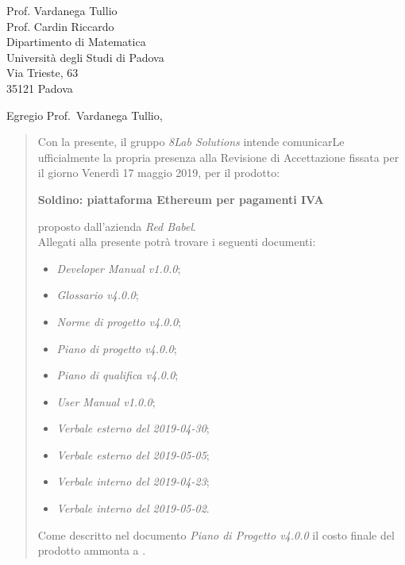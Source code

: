 
\begin{letter}{
		Prof. Vardanega Tullio \\
		Prof. Cardin Riccardo \\
		Dipartimento di Matematica \\
		Università degli Studi di Padova \\
		Via Trieste, 63 \\
		35121 Padova}
		
\opening{Egregio Prof.~Vardanega Tullio,}

\begin{quotation}
Con la presente, il gruppo \textit{8Lab Solutions} intende 
comunicarLe ufficialmente la propria presenza alla Revisione di 
Accettazione fissata per il giorno Venerdì 17 maggio 2019, per il prodotto:

\begin{center}
	\textbf{Soldino: piattaforma Ethereum per pagamenti IVA}
\end{center}

\noindent proposto dall'azienda \textit{Red Babel}. \\
Allegati alla presente potrà trovare i seguenti documenti:

\begin{itemize}
	
	\item \textit{Developer Manual v1.0.0};
	
	\item \textit{Glossario v4.0.0};
	
	\item \textit{Norme di progetto v4.0.0};

	\item \textit{Piano di progetto v4.0.0};

	\item \textit{Piano di qualifica v4.0.0};
	
	\item \textit{User Manual v1.0.0};
	
	
	\item \textit{Verbale esterno del 2019-04-30};
	\item \textit{Verbale esterno del 2019-05-05};
	\item \textit{Verbale interno del 2019-04-23};
	\item \textit{Verbale interno del 2019-05-02}.
\end{itemize}
	


\noindent Come descritto nel documento \textit{Piano di Progetto v4.0.0} il 
costo finale del prodotto ammonta a \textbf{}.\\


\end{quotation}
\end{letter}

